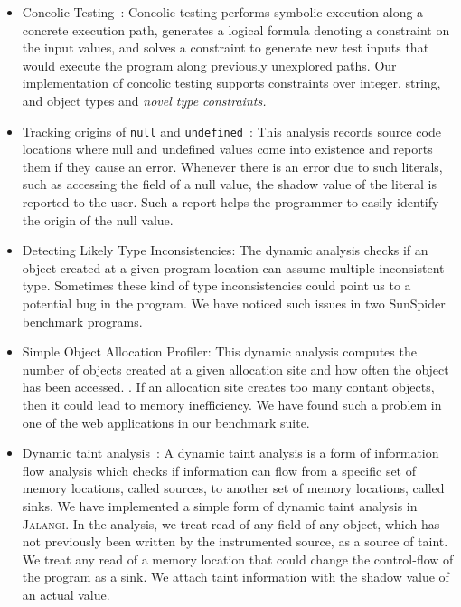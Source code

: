 \documentclass{sig-alternate}
\def\jalangi{\textsc{Jalangi}}
\begin{document}
\begin{itemize}
\item Concolic Testing~\cite{dart,cute}: Concolic testing performs
  symbolic execution along a concrete execution path, generates a
  logical formula denoting a constraint on the input values, and
  solves a constraint to generate new test inputs that would execute
  the program along previously unexplored paths.  Our implementation
  of concolic testing supports constraints over integer, string, and
  object types and \emph{novel type constraints.}
\item Tracking origins of \texttt{null} and
  \texttt{undefined}~\cite{Bond:2007:TBA:1297027.1297057}: This
  analysis records source code locations where null and undefined
  values come into existence and reports them if they cause an error.
  Whenever there is an error due to such literals, such as accessing
  the field of a null value, the shadow value of the literal is
  reported to the user.  Such a report helps the programmer to easily
  identify the origin of the null value.
\item Detecting Likely Type Inconsistencies: The dynamic analysis
  checks if an object created at a given program location can assume
  multiple inconsistent type.
  Sometimes these kind of type inconsistencies could point us to a
  potential bug in the program.  We have noticed such issues in two
  SunSpider benchmark programs.
\item Simple Object Allocation Profiler: This dynamic analysis
  computes the number of objects created at a given allocation site
  and how often the object has been accessed.%
  .  If an allocation site creates too many contant objects, then it
  could lead to memory inefficiency.  We have found such a problem in
  one of the web applications in our benchmark suite.
\item Dynamic taint
  analysis~\cite{songndss05}: A
  dynamic taint analysis is a form of information flow analysis which
  checks if information can flow from a specific set of memory
  locations, called sources, to another set of memory locations,
  called sinks.  We have implemented a simple form of dynamic taint
  analysis in \jalangi{}.  In the analysis, we treat read of any field
  of any object, which has not previously been written by the
  instrumented source, as a source of taint.  We treat any read of a
  memory location that could change the control-flow of the program as
  a sink.  We attach taint information with the shadow value of an
  actual value.
\end{itemize}
\end{document}
